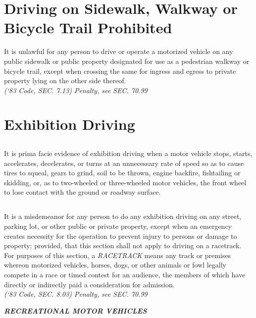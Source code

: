\section{Driving on Sidewalk, Walkway or Bicycle Trail Prohibited}
It is unlawful for any person to drive or operate a motorized vehicle on any public sidewalk or public property designated for use as a pedestrian walkway or bicycle trail, except when crossing the same for ingress and egress to private property lying on the other side thereof.\\
\emph{(‘83 Code, SEC. 7.13) Penalty, see SEC. 70.99}
\section{Exhibition Driving}
\subsection{}
It is prima facie evidence of exhibition driving when a motor vehicle stops, starts, accelerates, decelerates, or turns at an unnecessary rate of speed so as to cause tires to squeal, gears to grind, soil to be thrown, engine backfire, fishtailing or skidding, or, as to two-wheeled or three-wheeled motor vehicles, the front wheel to lose contact with the ground or roadway surface.
\subsection{}
It is a misdemeanor for any person to do any exhibition driving on any street, parking lot, or other public or private property, except when an emergency creates necessity for the operation to prevent injury to persons or damage to property; provided, that this section shall not apply to driving on a racetrack.  For purposes of this section, a \emph{RACETRACK} means any track or premises whereon motorized vehicles, horses, dogs, or other animals or fowl legally compete in a race or timed contest for an audience, the members of which have directly or indirectly paid a consideration for admission.\\
\emph{(‘83 Code, SEC. 8.03) Penalty, see SEC. 70.99}\\

\begin{center}
\emph{\textbf{\LARGE{RECREATIONAL MOTOR VEHICLES}}}
\end{center}

\setcounter{section}{14}
